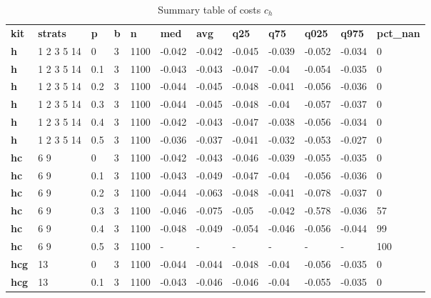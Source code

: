 \begin{longtable}[h]{|p{0.8cm}|p{1.5cm}|p{1cm}|p{1cm}|p{1cm}|p{1cm}|p{1cm}|p{1cm}|p{1cm}|p{1cm}|p{1cm}|p{1.5cm}|}
\caption{Summary table of costs $c_h$}
\label{tab:costs_mod_h} \\
      \hline
\textbf{ kit} & \textbf{ strats} & \textbf{ p} & \textbf{ b} & \textbf{ n} & \textbf{ med} & \textbf{ avg} & \textbf{ q25} & \textbf{ q75} & \textbf{ q025} & \textbf{ q975} & \textbf{ pct\_nan}
           \\
  \textbf{h   } &  1 2 3 5 14 &   0 & 3 & 1100 & -0.042 & -0.042 & -0.045 & -0.039 & -0.052 & -0.034 &   0
           \\
  \textbf{h   } &  1 2 3 5 14 & 0.1 & 3 & 1100 & -0.043 & -0.043 & -0.047 &  -0.04 & -0.054 & -0.035 &   0
           \\
  \textbf{h   } &  1 2 3 5 14 & 0.2 & 3 & 1100 & -0.044 & -0.045 & -0.048 & -0.041 & -0.056 & -0.036 &   0
           \\
  \textbf{h   } &  1 2 3 5 14 & 0.3 & 3 & 1100 & -0.044 & -0.045 & -0.048 &  -0.04 & -0.057 & -0.037 &   0
           \\
  \textbf{h   } &  1 2 3 5 14 & 0.4 & 3 & 1100 & -0.042 & -0.043 & -0.047 & -0.038 & -0.056 & -0.034 &   0
           \\
  \textbf{h   } &  1 2 3 5 14 & 0.5 & 3 & 1100 & -0.036 & -0.037 & -0.041 & -0.032 & -0.053 & -0.027 &   0
           \\
  \textbf{hc  } &  6 9        &   0 & 3 & 1100 & -0.042 & -0.043 & -0.046 & -0.039 & -0.055 & -0.035 &   0
           \\
  \textbf{hc  } &  6 9        & 0.1 & 3 & 1100 & -0.043 & -0.049 & -0.047 &  -0.04 & -0.056 & -0.036 &   0
           \\
  \textbf{hc  } &  6 9        & 0.2 & 3 & 1100 & -0.044 & -0.063 & -0.048 & -0.041 & -0.078 & -0.037 &   0
           \\
  \textbf{hc  } &  6 9        & 0.3 & 3 & 1100 & -0.046 & -0.075 &  -0.05 & -0.042 & -0.578 & -0.036 &  57
           \\
  \textbf{hc  } &  6 9        & 0.4 & 3 & 1100 & -0.048 & -0.049 & -0.054 & -0.046 & -0.056 & -0.044 &  99
           \\
  \textbf{hc  } &  6 9        & 0.5 & 3 & 1100 & - & - & - & - & - & - & 100
           \\
  \textbf{hcg } &  13         &   0 & 3 & 1100 & -0.044 & -0.044 & -0.048 &  -0.04 & -0.056 & -0.035 &   0
           \\
  \textbf{hcg } &  13         & 0.1 & 3 & 1100 & -0.043 & -0.046 & -0.046 &  -0.04 & -0.055 & -0.035 &   0

\end{longtable}
